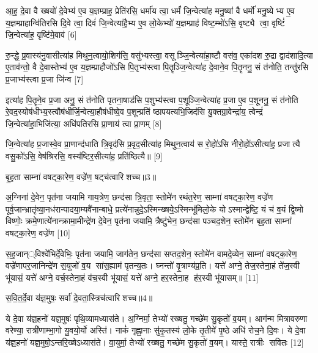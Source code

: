 आ॒ह॒ दे॒वा वै ख्षयो॑ दे॒वेभ्य॑ ए॒व य॒ज्ञम्प्राह॒ प्रेति॑रसि॒ धर्मा॑य त्वा॒ धर्मं॑ जि॒न्वेत्या॑ह मनु॒ष्या॑ वै धर्मो॑ मनु॒ष्येभ्य ए॒व य॒ज्ञम्प्राहान्वि॑तिरसि दि॒वे त्वा॒ दिवं॑ जि॒न्वेत्या॑है॒भ्य ए॒व लो॒केभ्यो॑ य॒ज्ञम्प्राह॑ विष्ट॒म्भो॑ऽसि॒ वृष्ट्यै त्वा॒ वृष्टिं॑ जि॒न्वेत्या॑ह॒ वृष्टि॑मे॒वाव॑ [6]

रु॒न्द्धे॒ प्र॒वास्य॑नु॒वासीत्या॑ह मिथुन॒त्वायो॒शिग॑सि॒ वसु॑भ्यस्त्वा॒ वसूञ्जि॒न्वेत्या॑हा॒ष्टौ वस॑व॒ एका॑दश रु॒द्रा द्वाद॑शादि॒त्या ए॒ताव॑न्तो॒ वै दे॒वास्तेभ्य॑ ए॒व य॒ज्ञम्प्राहौजो॑ऽसि पि॒तृभ्य॑स्त्वा पि॒तॄञ्जि॒न्वेत्या॑ह दे॒वाने॒व पि॒तॄननु॒ सं त॑नोति॒ तन्तु॑रसि प्र॒जाभ्य॑स्त्वा प्र॒जा जि॑न्व [7]

इत्या॑ह पि॒तॄने॒व प्र॒जा अनु॒ सं त॑नोति पृतना॒षाड॑सि प॒शुभ्य॑स्त्वा प॒शूञ्जि॒न्वेत्या॑ह प्र॒जा ए॒व प॒शूननु॒ सं त॑नोति रे॒वद॒स्योष॑धीभ्य॒स्त्वौष॑धीर्जि॒न्वेत्या॒हौष॑धीष्वे॒व प॒शून्प्रति॑ ष्ठापयत्यभि॒जिद॑सि यु॒क्तग्रा॒वेन्द्रा॑य॒ त्वेन्द्रं॑ जि॒न्वेत्या॑हा॒भिजि॑त्या॒ अधि॑पतिरसि प्रा॒णाय॑ त्वा प्रा॒णम् [8]

जि॒न्वेत्या॑ह प्र॒जास्वे॒व प्रा॒णान्द॑धाति त्रि॒वृद॑सि प्र॒वृद॒सीत्या॑ह मिथुन॒त्वाय॑ सरो॒हो॑ऽसि नीरो॒हो॑ऽसीत्या॑ह॒ प्रजात्यै वसु॒को॑ऽसि॒ वेष॑श्रिरसि॒ वस्य॑ष्टिर॒सीत्या॑ह॒ प्रति॑ष्ठित्यै॥ [9]

{\scriptsize {बृ॒ह॒ता साम्ना॑ वषट्का॒रेण॒ वज्रे॑ण॒ षट्च॑त्वारिशच्च॥3॥}}

अ॒ग्निना॑ दे॒वेन॒ पृत॑ना जयामि गाय॒त्रेण॒ छन्द॑सा त्रि॒वृता॒ स्तोमे॑न रथंत॒रेण॒ साम्ना॑ वषट्का॒रेण॒ वज्रे॑ण पूर्व॒जान्भ्रातृ॑व्या॒नध॑रान्पादया॒म्यवै॑नान्बाधे॒ प्रत्ये॑नान्नुदे॒ऽस्मिन्ख्षये॒ऽस्मिन्भू॑मिलो॒के योऽस्मान्द्वेष्टि॒ यं च॑ व॒यं द्वि॒ष्मो विष्णोः॒ क्रमे॒णात्ये॑नान्क्रामा॒मीन्द्रे॑ण दे॒वेन॒ पृत॑ना जयामि॒ त्रैष्टु॑भेन॒ छन्द॑सा पञ्चद॒शेन॒ स्तोमे॑न बृह॒ता साम्ना॑ वषट्का॒रेण॒ वज्रे॑ण [10]

स॒ह॒जान््विश्वे॑भिर्दे॒वेभिः॒ पृत॑ना जयामि॒ जाग॑तेन॒ छन्द॑सा सप्तद॒शेन॒ स्तोमे॑न वामदे॒व्येन॒ साम्ना॑ वषट्का॒रेण॒ वज्रे॑णापर॒जानिन्द्रे॑ण स॒युजो॑ व॒य सा॑स॒ह्याम॑ पृतन्य॒तः। घ्नन्तो॑ वृ॒त्राण्य॑प्र॒ति। यत्ते॑ अग्ने॒ तेज॒स्तेना॒हं ते॑ज॒स्वी भू॑यासं॒ यत्ते॑ अग्ने॒ वर्च॒स्तेना॒हं व॑च॒स्वी भू॑यासं॒ यत्ते॑ अग्ने॒ हर॒स्तेना॒ह ह॑र॒स्वी भू॑यासम्॥ [11]

{\scriptsize {स॒वि॒त॒र्दे॒वा य॑ज्ञ॒मुषः॒ सर्वा॑ दे॒वता॒स्त्रिच॑त्वारिशच्च॥4॥}}

ये दे॒वा य॑ज्ञ॒हनो॑ यज्ञ॒मुषः॑ पृथि॒व्यामध्यास॑ते। अ॒ग्निर्मा॒ तेभ्यो॑ रख्षतु॒ गच्छे॑म सु॒कृतो॑ व॒यम्। आग॑न्म मित्रावरुणा वरेण्या॒ रात्री॑णाम्भा॒गो यु॒वयो॒र्यो अस्ति॑। नाकं॑ गृह्णा॒नाः सु॑कृ॒तस्य॑ लो॒के तृ॒तीये॑ पृ॒ष्ठे अधि॑ रोच॒ने दि॒वः। ये दे॒वा य॑ज्ञ॒हनो॑ यज्ञ॒मुषो॒ऽन्तरि॒ख्षेऽध्यास॑ते। वा॒युर्मा॒ तेभ्यो॑ रख्षतु॒ गच्छे॑म सु॒कृतो॑ व॒यम्। यास्ते॒ रात्रीः सवितः [12]

